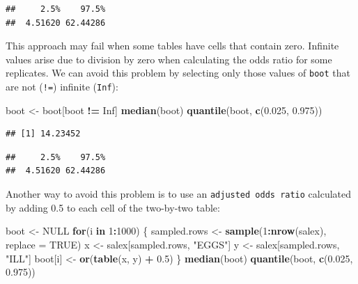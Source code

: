 \documentclass[12pt,a4paper]{book}
\newenvironment{Shaded}{\begin{snugshade}}{\end{snugshade}}
\newcommand{\ControlFlowTok}[1]{\textcolor[rgb]{0.13,0.29,0.53}{\textbf{#1}}}
\newcommand{\DataTypeTok}[1]{\textcolor[rgb]{0.13,0.29,0.53}{#1}}
\newcommand{\DecValTok}[1]{\textcolor[rgb]{0.00,0.00,0.81}{#1}}
\newcommand{\FloatTok}[1]{\textcolor[rgb]{0.00,0.00,0.81}{#1}}
\newcommand{\KeywordTok}[1]{\textcolor[rgb]{0.13,0.29,0.53}{\textbf{#1}}}
\newcommand{\NormalTok}[1]{#1}
\newcommand{\OperatorTok}[1]{\textcolor[rgb]{0.81,0.36,0.00}{\textbf{#1}}}
\newcommand{\OtherTok}[1]{\textcolor[rgb]{0.56,0.35,0.01}{#1}}
\newcommand{\StringTok}[1]{\textcolor[rgb]{0.31,0.60,0.02}{#1}}
\theoremstyle{definition}
\theoremstyle{definition}
\theoremstyle{definition}
\theoremstyle{remark}
\begin{document}
\begin{verbatim}
##     2.5%    97.5% 
##  4.51620 62.44286
\end{verbatim}

This approach may fail when some tables have cells that contain zero.
Infinite values arise due to division by zero when calculating the odds
ratio for some replicates. We can avoid this problem by selecting only
those values of \texttt{boot} that are not (\texttt{!=}) infinite
(\texttt{Inf}):

\begin{Shaded}
\begin{Highlighting}[]
\NormalTok{boot <-}\StringTok{ }\NormalTok{boot[boot }\OperatorTok{!=}\StringTok{ }\OtherTok{Inf}\NormalTok{]}
\KeywordTok{median}\NormalTok{(boot)}
\KeywordTok{quantile}\NormalTok{(boot, }\KeywordTok{c}\NormalTok{(}\FloatTok{0.025}\NormalTok{, }\FloatTok{0.975}\NormalTok{))}
\end{Highlighting}
\end{Shaded}

\begin{verbatim}
## [1] 14.23452
\end{verbatim}

\begin{verbatim}
##     2.5%    97.5% 
##  4.51620 62.44286
\end{verbatim}

Another way to avoid this problem is to use an
\texttt{adjusted\ odds\ ratio} calculated by adding 0.5 to each cell of
the two-by-two table:

\begin{Shaded}
\begin{Highlighting}[]
\NormalTok{boot <-}\StringTok{ }\OtherTok{NULL}
\ControlFlowTok{for}\NormalTok{(i }\ControlFlowTok{in} \DecValTok{1}\OperatorTok{:}\DecValTok{1000}\NormalTok{) \{}
\NormalTok{  sampled.rows <-}\StringTok{ }\KeywordTok{sample}\NormalTok{(}\DecValTok{1}\OperatorTok{:}\KeywordTok{nrow}\NormalTok{(salex), }\DataTypeTok{replace =} \OtherTok{TRUE}\NormalTok{)}
\NormalTok{  x <-}\StringTok{ }\NormalTok{salex[sampled.rows, }\StringTok{"EGGS"}\NormalTok{]}
\NormalTok{  y <-}\StringTok{ }\NormalTok{salex[sampled.rows, }\StringTok{"ILL"}\NormalTok{]}
\NormalTok{  boot[i] <-}\StringTok{ }\KeywordTok{or}\NormalTok{(}\KeywordTok{table}\NormalTok{(x, y) }\OperatorTok{+}\StringTok{ }\FloatTok{0.5}\NormalTok{)}
\NormalTok{  \}}
\KeywordTok{median}\NormalTok{(boot)}
\KeywordTok{quantile}\NormalTok{(boot, }\KeywordTok{c}\NormalTok{(}\FloatTok{0.025}\NormalTok{, }\FloatTok{0.975}\NormalTok{))}
\end{Highlighting}
\end{Shaded}
\end{document}

